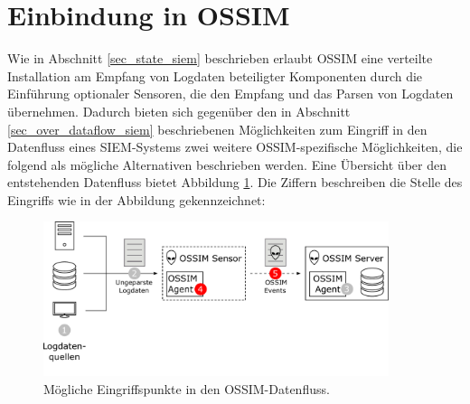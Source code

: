 \section{Einbindung in OSSIM}

\label{sec_impl_integration_into_ossim}

%
%
%
%

Wie in Abschnitt \ref{sec_state_siem} beschrieben erlaubt OSSIM eine verteilte Installation am Empfang von Logdaten beteiligter Komponenten durch die Einführung optionaler Sensoren, die den Empfang und das Parsen von Logdaten übernehmen. Dadurch bieten sich gegenüber den in Abschnitt \ref{sec_over_dataflow_siem} beschriebenen Möglichkeiten zum Eingriff in den Datenfluss eines SIEM-Systems zwei weitere OSSIM-spezifische Möglichkeiten, die folgend als mögliche Alternativen beschrieben werden. Eine Übersicht über den entstehenden Datenfluss bietet Abbildung \ref{fig:ossim_data_access_point}. Die Ziffern beschreiben die Stelle des Eingriffs wie in der Abbildung gekennzeichnet:

\begin{figure}[]
    \centering
        \includegraphics[width=0.9\textwidth]{dia/ossim_data_access_point.pdf}
    \caption{Mögliche Eingriffspunkte in den OSSIM-Datenfluss.}
    \label{fig:ossim_data_access_point}
\end{figure}


